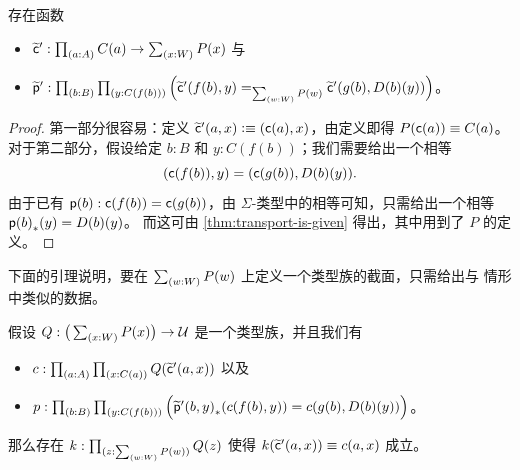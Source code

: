 \begin{lem}\label{thm:flattening-cp}
  存在函数
  \begin{itemize}
  \item $\cct':\prd{a:A} C(a) \to \sm{x:W} P(x)$ 与
  \item $\ppt':\prd{b:B}{y:C(f(b))} \Big(\cct'(f(b),y)=_{\sm{w:W}P(w)}\cct'(g(b),D(b)(y))\Big)$。
  \end{itemize}
\end{lem}

\begin{proof}
  第一部分很容易：定义 $\widetilde{\mathsf{c}}'(a,x) \vcentcolon\equiv (\mathsf{c}(a),x)$，由定义即得 $P(\mathsf{c}(a))\equiv C(a)$。
  对于第二部分，假设给定 $b:B$ 和 $y:C(f(b))$；我们需要给出一个相等
  \[ (\mathsf{c}(f(b)),y) = (\mathsf{c}(g(b)),D(b)(y)). \]
  由于已有 $\mathsf{p}(b):\mathsf{c}(f(b))=\mathsf{c}(g(b))$，由 $\Sigma$-类型中的相等可知，只需给出一个相等 ${\mathsf{p}(b)}_{*}\mathopen{}\left({y}\right)\mathclose{} = D(b)(y)$。
  而这可由 \cref{thm:transport-is-given} 得出，其中用到了 $P$ 的定义。
\end{proof}

下面的引理说明，要在 $\sm{w:W} P(w)$ 上定义一个类型族的截面，只需给出与 \Wtil 情形中类似的数据。

\begin{lem}\label{thm:flattening-rect}
  假设 $Q:\big(\sm{x:W} P(x)\big) \to \type$ 是一个类型族，并且我们有
  \begin{itemize}
  \item $c : \prd{a:A}{x:C(a)} Q(\cct'(a,x))$ 以及
  \item $p : \prd{b:B}{y:C(f(b))} \Big(\trans{\ppt'(b,y)}{c(f(b),y)} = c(g(b),D(b)(y))\Big)$。%
  \end{itemize}
  那么存在 $k:\prd{z:\sm{w:W} P(w)} Q(z)$ 使得 $k(\widetilde{\mathsf{c}}'(a,x)) \equiv c(a,x)$ 成立。
\end{lem}

